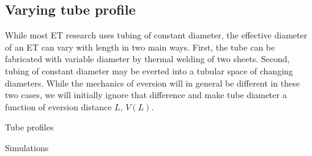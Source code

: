 \documentclass[letterpaper]{article}
\begin{document}
\subsection{Varying tube profile}

While most ET research uses tubing of constant diameter, the effective diameter of an ET can vary with
length in two main ways.   First, the tube can be fabricated with variable diameter by thermal welding of two sheets.
Second, tubing of constant diameter may be everted into a tubular space of changing diameters.
While the mechanics of eversion will in general be different in these two cases, we will initially ignore that difference
and make tube diameter a function of eversion distance $L$, $V(L)$.

Tube profiles

Simulations






\end{document}
